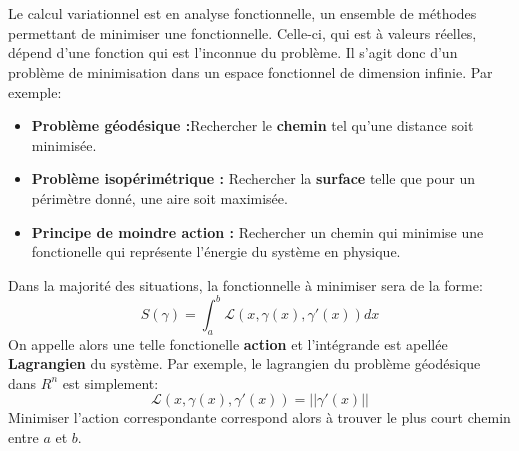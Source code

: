 \documentclass{report}
\begin{document}
\chapter*{}
Le calcul variationnel est en analyse fonctionnelle, un ensemble de méthodes permettant de minimiser une fonctionnelle. Celle-ci, qui est à valeurs réelles, dépend d'une fonction qui est l'inconnue du problème. Il s'agit donc d'un problème de minimisation dans un espace fonctionnel de dimension infinie. Par exemple:
\begin{itemize}
   \item \textbf{Problème géodésique :}Rechercher le \textbf{chemin} tel qu'une distance soit minimisée.
   \item \textbf{Problème isopérimétrique :} Rechercher la \textbf{surface} telle que pour un périmètre donné, une aire soit maximisée.
   \item \textbf{Principe de moindre action :} Rechercher un chemin qui minimise une fonctionelle qui représente l'énergie du système en physique.
\end{itemize}

Dans la majorité des situations, la fonctionnelle à minimiser sera de la forme:
\[
   S(\gamma) = \int_a^b \mathcal{L}(x, \gamma(x), \gamma'(x)) dx 
\]
On appelle alors une telle fonctionelle \textbf{action} et l'intégrande est apellée \textbf{Lagrangien} du système. Par exemple, le lagrangien du problème géodésique dans \(R^n\) est simplement:
\[
   \mathcal{L}(x, \gamma(x), \gamma'(x)) = ||\gamma'(x)||
\]
Minimiser l'action correspondante correspond alors à trouver le plus court chemin entre \(a\) et \(b\).

 

\subsection*{}
\end{document}
